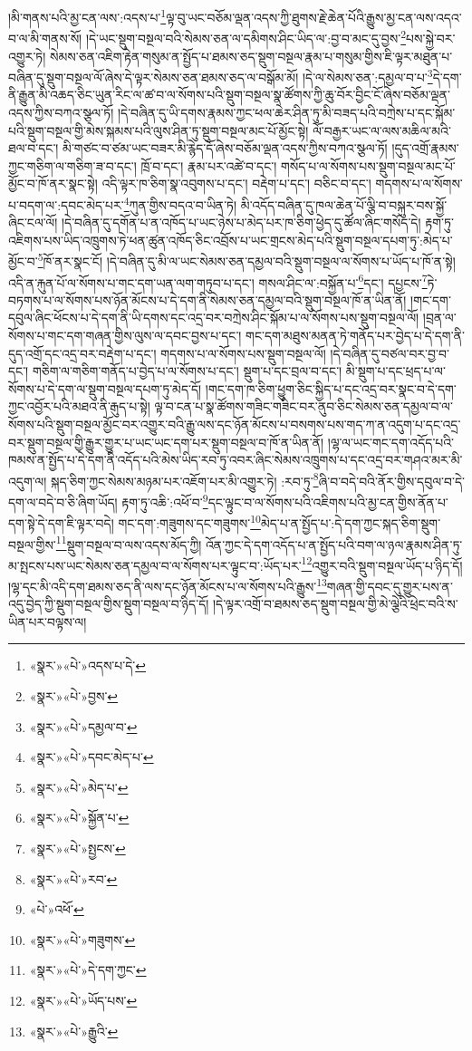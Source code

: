 །མི་གནས་པའི་མྱ་ངན་ལས་:འདས་པ་\footnote{«སྣར་»«པེ་»འདས་པ་དེ་}ལྟ་བུ་ཡང་བཅོམ་ལྡན་འདས་ཀྱི་ཐུགས་རྗེ་ཆེན་པོའི་རྒྱུས་མྱ་ངན་ལས་འདའ་བ་ལ་མི་གནས་སོ། །དེ་ཡང་སྡུག་བསྔལ་བའི་སེམས་ཅན་ལ་དམིགས་ཤིང་ཡིད་ལ་:བྱ་བ་མང་དུ་བྱས་\footnote{«སྣར་»«པེ་»བྱས་}པས་སྐྱེ་བར་འགྱུར་ཏེ། སེམས་ཅན་འཇིག་རྟེན་གསུམ་ན་སྤྱོད་པ་ཐམས་ཅད་སྡུག་བསྔལ་རྣམ་པ་གསུམ་གྱིས་ཇི་ལྟར་མཐུན་པ་བཞིན་དུ་སྡུག་བསྔལ་ལོ་ཞེས་དེ་ལྟར་སེམས་ཅན་ཐམས་ཅད་ལ་བསྒོམ་མོ། །དེ་ལ་སེམས་ཅན་:དམྱལ་བ་པ་\footnote{«སྣར་»«པེ་»དམྱལ་བ་}དེ་དག་ནི་རྒྱུན་མི་འཆད་ཅིང་ཡུན་རིང་ལ་ཚ་བ་ལ་སོགས་པའི་སྡུག་བསྔལ་སྣ་ཚོགས་ཀྱི་ཆུ་བོར་བྱིང་ངོ་ཞེས་བཅོམ་ལྡན་འདས་ཀྱིས་བཀའ་སྩལ་ཏོ། །དེ་བཞིན་དུ་ཡི་དགས་རྣམས་ཀྱང་ཕལ་ཆེར་ཤིན་ཏུ་མི་བཟད་པའི་བཀྲེས་པ་དང་སྐོམ་པའི་སྡུག་བསྔལ་གྱི་མེས་སྐམས་པའི་ལུས་ཤིན་ཏུ་སྡུག་བསྔལ་མང་པོ་མྱོང་སྟེ། ལོ་བརྒྱར་ཡང་ལ་ལས་མཆིལ་མའི་ཐལ་བ་དང་། མི་གཙང་བ་ཙམ་ཡང་བཟར་མི་རྙེད་དོ་ཞེས་བཅོམ་ལྡན་འདས་ཀྱིས་བཀའ་སྩལ་ཏོ། །དུད་འགྲོ་རྣམས་ཀྱང་གཅིག་ལ་གཅིག་ཟ་བ་དང་། ཁྲོ་བ་དང་། རྣམ་པར་འཚེ་བ་དང་། གསོད་པ་ལ་སོགས་པས་སྡུག་བསྔལ་མང་པོ་མྱོང་བ་ཁོ་ནར་སྣང་སྟེ། འདི་ལྟར་ཁ་ཅིག་སྣ་འབུགས་པ་དང་། བརྡེག་པ་དང་། བཅིང་བ་དང་། གདགས་པ་ལ་སོགས་པ་བདག་ལ་:དབང་མེད་པར་\footnote{«སྣར་»«པེ་»དབང་མེད་པ་}ཀུན་གྱིས་བདའ་བ་ཡིན་ཏེ། མི་འདོད་བཞིན་དུ་ཁལ་ཆེན་པོ་ལྕི་བ་བསྐུར་བས་སྐྱོ་ཞིང་ངལ་ལོ། །དེ་བཞིན་དུ་དགོན་པ་ན་འཁོད་པ་ཡང་ཉེས་པ་མེད་པར་ཁ་ཅིག་ཕྱེད་དུ་ཚོལ་ཞིང་གསོད་དེ། རྟག་ཏུ་འཇིགས་པས་ཡིད་འཁྲུགས་ཏེ་ཕན་ཚུན་འཁོད་ཅིང་འབྲོས་པ་ཡང་གྲངས་མེད་པའི་སྡུག་བསྔལ་དཔག་ཏུ་:མེད་པ་མྱོང་བ་\footnote{«སྣར་»«པེ་»མེད་པ་}ཁོ་ནར་སྣང་ངོ། །དེ་བཞིན་དུ་མི་ལ་ཡང་སེམས་ཅན་དམྱལ་བའི་སྡུག་བསྔལ་ལ་སོགས་པ་ཡོད་པ་ཁོ་ན་སྟེ། འདི་ན་རྐུན་པོ་ལ་སོགས་པ་གང་དག་ཡན་ལག་གཏུབ་པ་དང་། གསལ་ཤིང་ལ་:བསྐྱོན་པ་\footnote{«སྣར་»«པེ་»སྐྱོན་པ་}དང་། དཔྱངས་\footnote{«སྣར་»«པེ་»སྤྱངས་}ཏེ་བཏགས་པ་ལ་སོགས་པས་ཉོན་མོངས་པ་དེ་དག་ནི་སེམས་ཅན་དམྱལ་བའི་སྡུག་བསྔལ་ཁོ་ན་ཡིན་ནོ། །གང་དག་དབུལ་ཞིང་ཕོངས་པ་དེ་དག་ནི་ཡི་དགས་དང་འདྲ་བར་བཀྲེས་ཤིང་སྐོམ་པ་ལ་སོགས་པས་སྡུག་བསྔལ་ལོ། །བྲན་ལ་སོགས་པ་གང་དག་གཞན་གྱིས་ལུས་ལ་དབང་བྱས་པ་དང་། གང་དག་མཐུས་མནན་ཏེ་གནོད་པར་བྱེད་པ་དེ་དག་ནི་དུད་འགྲོ་དང་འདྲ་བར་བརྡེག་པ་དང་། གདགས་པ་ལ་སོགས་པས་སྡུག་བསྔལ་ལོ། །དེ་བཞིན་དུ་བཙལ་བར་བྱ་བ་དང་། གཅིག་ལ་གཅིག་གནོད་པ་བྱེད་པ་ལ་སོགས་པ་དང་། སྡུག་པ་དང་བྲལ་བ་དང་། མི་སྡུག་པ་དང་ཕྲད་པ་ལ་སོགས་པ་དེ་དག་ལ་སྡུག་བསྔལ་དཔག་ཏུ་མེད་དོ། །གང་དག་ཁ་ཅིག་ཕྱུག་ཅིང་སྐྱིད་པ་དང་འདྲ་བར་སྣང་བ་དེ་དག་ཀྱང་འབྱོར་པའི་མཐའ་ནི་རྒུད་པ་སྟེ། ལྟ་བ་ངན་པ་སྣ་ཚོགས་གཟིང་གཟིང་བར་ནུབ་ཅིང་སེམས་ཅན་དམྱལ་བ་ལ་སོགས་པའི་སྡུག་བསྔལ་མྱོང་བར་འགྱུར་བའི་རྒྱུ་ལས་དང་ཉོན་མོངས་པ་བསགས་པས་གད་ཀ་ན་འདུག་པ་དང་འདྲ་བར་སྡུག་བསྔལ་གྱི་རྒྱུར་གྱུར་པ་ཡང་ཡང་དག་པར་སྡུག་བསྔལ་བ་ཁོ་ན་ཡིན་ནོ། །ལྷ་ལ་ཡང་གང་དག་འདོད་པའི་ཁམས་ན་སྤྱོད་པ་དེ་དག་ནི་འདོད་པའི་མེས་ཡིད་རབ་ཏུ་འབར་ཞིང་སེམས་འཁྲུགས་པ་དང་འདྲ་བར་གཤའ་མར་མི་འདུག་ལ། སྐད་ཅིག་ཀྱང་སེམས་མཉམ་པར་འཇོག་པར་མི་འགྱུར་ཏེ། :རབ་ཏུ་\footnote{«སྣར་»«པེ་»རབ་}ཞི་བ་བདེ་བའི་ནོར་གྱིས་དབུལ་བ་དེ་དག་ལ་བདེ་བ་ཅི་ཞིག་ཡོད། རྟག་ཏུ་འཆི་:འཕོ་བ་\footnote{«པེ་»འཕོ་}དང་ལྟུང་བ་ལ་སོགས་པའི་འཇིགས་པའི་མྱ་ངན་གྱིས་ནོན་པ་དག་སྟེ་དེ་དག་ཇི་ལྟར་བདེ། གང་དག་:གཟུགས་དང་གཟུགས་\footnote{«སྣར་»«པེ་»གཟུགས་}མེད་པ་ན་སྤྱོད་པ་:དེ་དག་ཀྱང་སྐད་ཅིག་སྡུག་བསྔལ་གྱིས་\footnote{«སྣར་»«པེ་»དེ་དག་ཀྱང་}སྡུག་བསྔལ་བ་ལས་འདས་མོད་ཀྱི། འོན་ཀྱང་དེ་དག་འདོད་པ་ན་སྤྱོད་པའི་བག་ལ་ཉལ་རྣམས་ཤིན་ཏུ་མ་སྤངས་པས་ཡང་སེམས་ཅན་དམྱལ་བ་ལ་སོགས་པར་ལྟུང་བ་:ཡོད་པར་\footnote{«སྣར་»«པེ་»ཡོད་པས་}འགྱུར་བའི་སྡུག་བསྔལ་ཡོད་པ་ཉིད་དོ། །ལྷ་དང་མི་འདི་དག་ཐམས་ཅད་ནི་ལས་དང་ཉོན་མོངས་པ་ལ་སོགས་པའི་རྒྱུས་\footnote{«སྣར་»«པེ་»རྒྱུའི་}གཞན་གྱི་དབང་དུ་གྱུར་པས་ན་འདུ་བྱེད་ཀྱི་སྡུག་བསྔལ་གྱིས་སྡུག་བསྔལ་བ་ཉིད་དོ། །དེ་ལྟར་འགྲོ་བ་ཐམས་ཅད་སྡུག་བསྔལ་གྱི་མེ་ལྕེའི་ཕྲེང་བའི་ས་ཡིན་པར་བལྟས་ལ། 